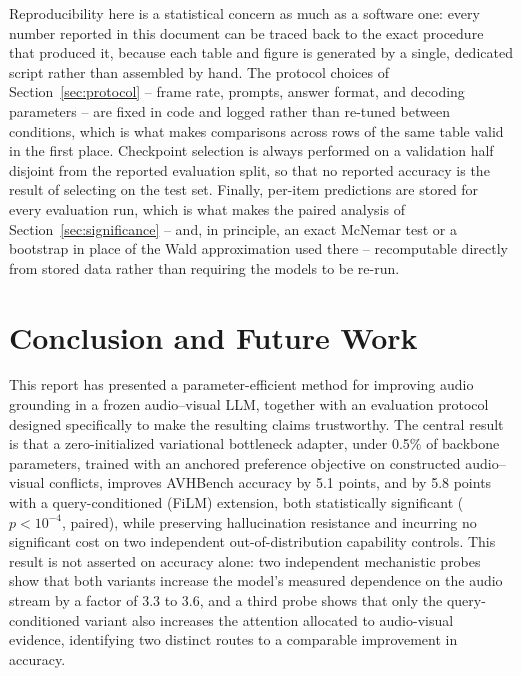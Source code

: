 \documentclass[11pt,a4paper,oneside]{article}
\begin{document}
Reproducibility here is a statistical concern as much as a software one: every number reported in
this document can be traced back to the exact procedure that produced it, because each table and
figure is generated by a single, dedicated script rather than assembled by hand. The protocol choices
of Section~\ref{sec:protocol} -- frame rate, prompts, answer format, and decoding parameters -- are
fixed in code and logged rather than re-tuned between conditions, which is what makes comparisons
across rows of the same table valid in the first place. Checkpoint selection is always performed on a
validation half disjoint from the reported evaluation split, so that no reported accuracy is the
result of selecting on the test set. Finally, per-item predictions are stored for every evaluation
run, which is what makes the paired analysis of Section~\ref{sec:significance} -- and, in principle,
an exact McNemar test or a bootstrap in place of the Wald approximation used there -- recomputable
directly from stored data rather than requiring the models to be re-run.

\clearpage
\section{Conclusion and Future Work}
\label{sec:conclusion}

This report has presented a parameter-efficient method for improving audio grounding in a frozen
audio--visual LLM, together with an evaluation protocol designed specifically to make the resulting
claims trustworthy. The central result is that a zero-initialized variational bottleneck adapter,
under 0.5\% of backbone parameters, trained with an anchored preference objective on constructed
audio--visual conflicts, improves AVHBench accuracy by 5.1 points, and by 5.8 points with a
query-conditioned (FiLM) extension, both statistically significant ($p<10^{-4}$, paired), while
preserving hallucination resistance and incurring no significant cost on two independent
out-of-distribution capability controls. This result is not asserted on accuracy alone: two
independent mechanistic probes show that both variants increase the model's measured dependence on
the audio stream by a factor of 3.3 to 3.6, and a third probe shows that only the query-conditioned
variant also increases the attention allocated to audio-visual evidence, identifying two distinct
routes to a comparable improvement in accuracy.
\end{document}
